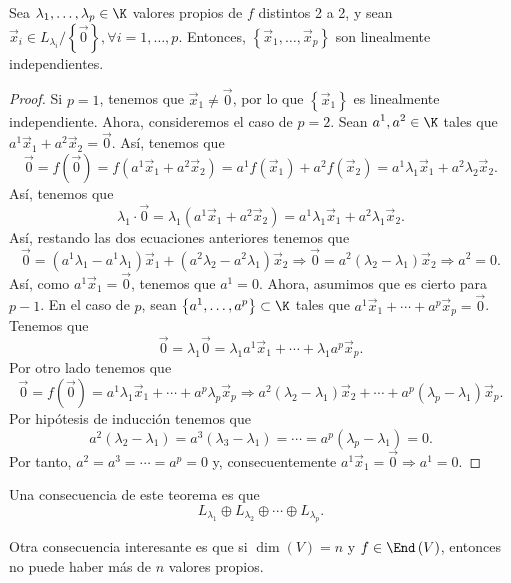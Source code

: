 \begin{ftheorem}[]
	\normalfont Sea $\displaystyle \lambda_{1}, \ldots, \lambda_{p} \in \K $ valores propios de $\displaystyle f $ distintos 2 a 2, y sean $\displaystyle \vec{x}_{i} \in L_{\lambda_{i}} / \left\{ \vec{0}\right\}, \forall i = 1, \ldots, p $. Entonces, $\displaystyle \left\{ \vec{x}_{1}, \ldots, \vec{x}_{p}\right\}  $ son linealmente independientes.
\end{ftheorem}
\begin{proof}
	Si $\displaystyle p = 1 $, tenemos que $\displaystyle \vec{x}_{1} \neq \vec{0} $, por lo que $\displaystyle \left\{ \vec{x}_{1}\right\}  $ es linealmente independiente. Ahora, consideremos el caso de $\displaystyle p = 2 $. Sean $\displaystyle a^{1}, a^{2} \in \K $ tales que $\displaystyle a^{1}\vec{x}_{1} + a^{2}\vec{x}_{2} = \vec{0} $. Así, tenemos que
	\[\vec{0} = f\left(\vec{0}\right) = f\left(a^{1}\vec{x}_{1} + a^{2}\vec{x}_{2}\right) = a^{1}f\left(\vec{x}_{1}\right) + a^{2}f\left(\vec{x}_{2}\right) = a^{1}\lambda_{1}\vec{x}_{1} + a^{2}\lambda_{2}\vec{x}_{2} .\]
Así, tenemos que
\[\lambda_{1} \cdot \vec{0} = \lambda_{1}\left(a^{1}\vec{x}_{1} + a^{2}\vec{x}_{2}\right) = a^{1}\lambda_{1}\vec{x}_{1} + a^{2}\lambda_{1}\vec{x}_{2} .\]
Así, restando las dos ecuaciones anteriores tenemos que
\[ \vec{0} = \left(a^{1}\lambda_{1} - a^{1}\lambda_{1}\right) \vec{x}_{1} + \left(a^{2}\lambda_{2}-a^{2}\lambda_{1}\right)\vec{x}_{2} \Rightarrow \vec{0} = a^{2}\left(\lambda_{2}-\lambda_{1}\right)\vec{x}_{2} \Rightarrow a^{2} = 0 .\]
Así, como $\displaystyle a^{1}\vec{x}_{1} = \vec{0} $, tenemos que $\displaystyle a^{1} = 0 $. Ahora, asumimos que es cierto para $\displaystyle p - 1 $. En el caso de $\displaystyle p $, sean $\displaystyle \left\{ a^{1}, \ldots, a^{p}\right\} \subset \K $ tales que $\displaystyle a^{1}\vec{x}_{1} + \cdots + a^{p}\vec{x}_{p} = \vec{0} $. Tenemos que
\[\vec{0} = \lambda_{1} \vec{0} = \lambda_{1}a^{1}\vec{x}_{1} + \cdots + \lambda_{1}a^{p}\vec{x}_{p} .\]
Por otro lado tenemos que
\[\vec{0} = f\left(\vec{0}\right) = a^{1}\lambda_{1}\vec{x}_{1} + \cdots + a^{p}\lambda_{p}\vec{x}_{p} \Rightarrow a^{2}\left(\lambda_{2}-\lambda_{1}\right)\vec{x}_{2} + \cdots + a^{p}\left(\lambda_{p}-\lambda_{1}\right)\vec{x}_{p} .\]
Por hipótesis de inducción tenemos que 
\[ a^{2}\left(\lambda_{2}-\lambda_{1}\right) = a^{3}\left(\lambda_{3}-\lambda_{1}\right) = \cdots = a^{p}\left(\lambda_{p}-\lambda_{1}\right) = 0 .\]
Por tanto, $\displaystyle a^{2} = a^{3} = \cdots = a^{p} = 0 $ y, consecuentemente $\displaystyle a^{1}\vec{x}_{1} = \vec{0} \Rightarrow a^{1} = 0 $.
\end{proof}
\begin{observation}
\normalfont Una consecuencia de este teorema es que 
\[L_{\lambda_{1}}\oplus L_{\lambda_{2}} \oplus \cdots \oplus L_{\lambda_{p}} .\]
\end{observation}
\begin{observation}
\normalfont Otra consecuencia interesante es que si $\displaystyle \dim\left(V\right) = n $ y $\displaystyle f \in \End\left(V\right) $, entonces no puede haber más de $\displaystyle n $ valores propios.
\end{observation}
